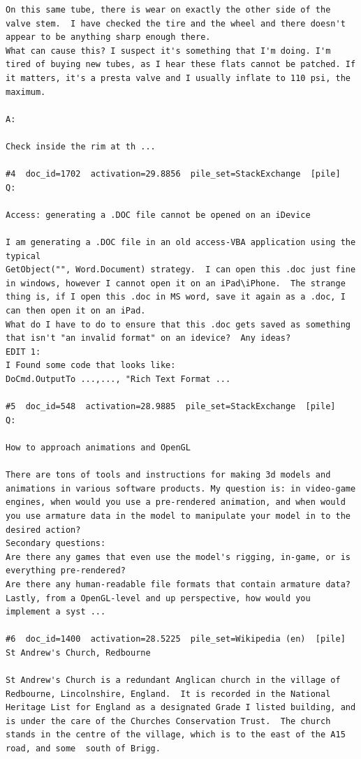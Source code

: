 \begin{verbatim}
On this same tube, there is wear on exactly the other side of the valve stem.  I have checked the tire and the wheel and there doesn't appear to be anything sharp enough there.
What can cause this? I suspect it's something that I'm doing. I'm tired of buying new tubes, as I hear these flats cannot be patched. If it matters, it's a presta valve and I usually inflate to 110 psi, the maximum.

A:

Check inside the rim at th ...

#4  doc_id=1702  activation=29.8856  pile_set=StackExchange  [pile]
Q:

Access: generating a .DOC file cannot be opened on an iDevice

I am generating a .DOC file in an old access-VBA application using the typical 
GetObject("", Word.Document) strategy.  I can open this .doc just fine in windows, however I cannot open it on an iPad\iPhone.  The strange thing is, if I open this .doc in MS word, save it again as a .doc, I can then open it on an iPad.
What do I have to do to ensure that this .doc gets saved as something that isn't "an invalid format" on an idevice?  Any ideas?  
EDIT 1: 
I Found some code that looks like:
DoCmd.OutputTo ...,..., "Rich Text Format ...

#5  doc_id=548  activation=28.9885  pile_set=StackExchange  [pile]
Q:

How to approach animations and OpenGL

There are tons of tools and instructions for making 3d models and animations in various software products. My question is: in video-game engines, when would you use a pre-rendered animation, and when would you use armature data in the model to manipulate your model in to the desired action?
Secondary questions:
Are there any games that even use the model's rigging, in-game, or is everything pre-rendered? 
Are there any human-readable file formats that contain armature data?
Lastly, from a OpenGL-level and up perspective, how would you implement a syst ...

#6  doc_id=1400  activation=28.5225  pile_set=Wikipedia (en)  [pile]
St Andrew's Church, Redbourne

St Andrew's Church is a redundant Anglican church in the village of Redbourne, Lincolnshire, England.  It is recorded in the National Heritage List for England as a designated Grade I listed building, and is under the care of the Churches Conservation Trust.  The church stands in the centre of the village, which is to the east of the A15 road, and some  south of Brigg.


\end{verbatim}
